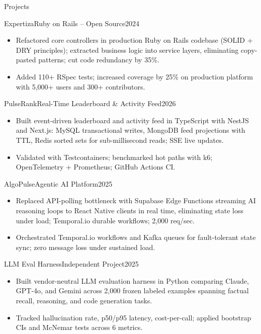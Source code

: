 \documentclass[]{mcdowellcv}
\begin{document}
\begin{cvsection}{Projects}
  \begin{cvsubsection}{Expertiza}{Ruby on Rails -- Open Source}{2024}
    \begin{itemize}
      \item Refactored core controllers in production Ruby on Rails codebase (SOLID + DRY principles); extracted business logic into service layers, eliminating copy-pasted patterns; cut code redundancy by 35\%.
      \item Added 110+ RSpec tests; increased coverage by 25\% on production platform with 5,000+ users and 300+ contributors.
    \end{itemize}
    \vspace{-1.5pt}
  \end{cvsubsection}

  \begin{cvsubsection}{PulseRank}{Real-Time Leaderboard \& Activity Feed}{2026}
    \begin{itemize}
      \item Built event-driven leaderboard and activity feed in TypeScript with NestJS and Next.js: MySQL transactional writes, MongoDB feed projections with TTL, Redis sorted sets for sub-millisecond reads; SSE live updates.
      \item Validated with Testcontainers; benchmarked hot paths with k6; OpenTelemetry + Prometheus; GitHub Actions CI.
    \end{itemize}
    \vspace{-1.5pt}
  \end{cvsubsection}

  \begin{cvsubsection}{AlgoPulse}{Agentic AI Platform}{2025}
    \begin{itemize}
      \item Replaced API-polling bottleneck with Supabase Edge Functions streaming AI reasoning loops to React Native clients in real time, eliminating state loss under load; Temporal.io durable workflows; 2,000 req/sec.
      \item Orchestrated Temporal.io workflows and Kafka queues for fault-tolerant state sync; zero message loss under sustained load.
    \end{itemize}
    \vspace{-1.5pt}
  \end{cvsubsection}

  \begin{cvsubsection}{LLM Eval Harness}{Independent Project}{2025}
    \begin{itemize}
      \item Built vendor-neutral LLM evaluation harness in Python comparing Claude, GPT-4o, and Gemini across 2,000 frozen labeled examples spanning factual recall, reasoning, and code generation tasks.
      \item Tracked hallucination rate, p50/p95 latency, cost-per-call; applied bootstrap CIs and McNemar tests across 6 metrics.
    \end{itemize}
  \end{cvsubsection}
\end{cvsection}
\end{document}
